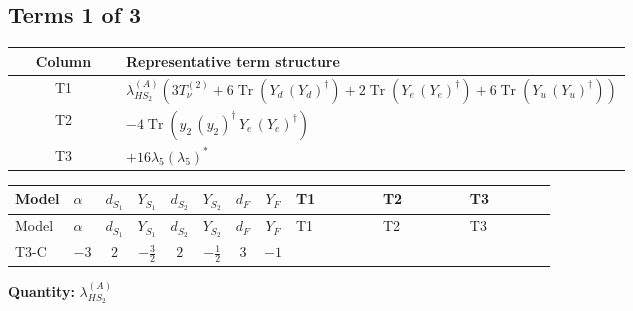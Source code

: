 \documentclass[8pt]{article}
\begin{document}
\begin{landscape}
\subsection*{Terms 1 of 3}
\begin{center}
\begin{tabular}{@{}c >{\raggedright\arraybackslash}p{0.82\linewidth}@{}}
\toprule
Column & Representative term structure \\
\midrule
T1 & \(\displaystyle {\lambda_{HS_2}^{(A)}} (3 T_{\nu}^{(2)}+6 \operatorname{Tr}\!\left({Y_d}\,\left({Y_d}\right)^{\dagger}\right)+2 \operatorname{Tr}\!\left({Y_e}\,\left({Y_e}\right)^{\dagger}\right)+6 \operatorname{Tr}\!\left({Y_u}\,\left({Y_u}\right)^{\dagger}\right))\) \\
\midrule
T2 & \(\displaystyle -4 \operatorname{Tr}\!\left({y_2}\,\left({y_2}\right)^{\dagger}\,{Y_e}\,\left({Y_e}\right)^{\dagger}\right)\) \\
\midrule
T3 & \(\displaystyle +16 {\lambda_5} \left({\lambda_5}\right)^{*}\) \\
\midrule
\bottomrule
\end{tabular}
\end{center}
\smallskip
\tiny
\begin{longtable}{@{}llcccccc >{\raggedright\arraybackslash}p{0.21\linewidth} >{\raggedright\arraybackslash}p{0.21\linewidth} >{\raggedright\arraybackslash}p{0.21\linewidth}@{}}
\toprule
Model & $\alpha$ & $d_{S_1}$ & $Y_{S_1}$ & $d_{S_2}$ & $Y_{S_2}$ & $d_F$ & $Y_F$ & T1 & T2 & T3 \\
\midrule
\endfirsthead
\toprule
Model & $\alpha$ & $d_{S_1}$ & $Y_{S_1}$ & $d_{S_2}$ & $Y_{S_2}$ & $d_F$ & $Y_F$ & T1 & T2 & T3 \\
\midrule
\endhead
T3-C & $-3$ & $2$ & $-\frac{3}{2}$ & $2$ & $-\frac{1}{2}$ & $3$ & $-1$ & \scriptsize\adjustbox{max width=\linewidth}{$\begin{gathered} {\lambda_{HS_2}^{(A)}} (3 T_{\nu}^{(2)}+6 \operatorname{Tr}\!\left({Y_d}\,\left({Y_d}\right)^{\dagger}\right)+2 \operatorname{Tr}\!\left({Y_e}\,\left({Y_e}\right)^{\dagger}\right)+6 \operatorname{Tr}\!\left({Y_u}\,\left({Y_u}\right)^{\dagger}\right))\end{gathered}$} & \scriptsize\adjustbox{max width=\linewidth}{$\begin{gathered} -4 \operatorname{Tr}\!\left({y_2}\,\left({y_2}\right)^{\dagger}\,{Y_e}\,\left({Y_e}\right)^{\dagger}\right)\end{gathered}$} & \scriptsize\adjustbox{max width=\linewidth}{$\begin{gathered} +16 {\lambda_5} \left({\lambda_5}\right)^{*}\end{gathered}$} \\
\midrule
\bottomrule
\end{longtable}
\clearpage
\noindent\textbf{Quantity: }$\lambda_{HS_2}^{(A)}$\par\smallskip

\end{landscape}
\end{document}
